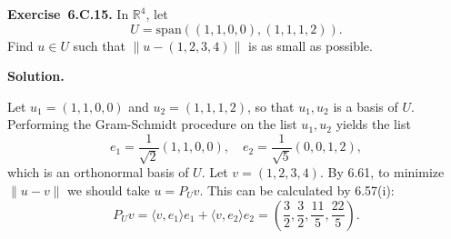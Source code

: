 \documentclass[11pt]{article}
\newcommand{\ProblemAnnounce}{\noindent}
\newcommand{\SolutionAnnounce}{\noindent\textbf{Solution.}\par\medskip}
\newcommand{\Exercise}[1]{\textbf{Exercise~#1.}\;}
\newcommand{\R}{\mathbb{R}}
\newcommand{\<}{\langle}
\renewcommand{\>}{\rangle}
\begin{document}
\begin{problemBox}
\ProblemAnnounce
\Exercise{6.C.15}
In $\R^4$, let
\[U = \text{span}((1, 1, 0, 0), (1, 1, 1, 2)).\]
Find $u \in U$ such that $\|u - (1, 2, 3, 4)\|$ is as small as possible.
\end{problemBox}

\begin{solutionBox}
\SolutionAnnounce
\doublespacing

Let $u_1 = (1, 1, 0, 0)$ and $u_2 = (1, 1, 1, 2)$, so that $u_1, u_2$ is a basis of $U$. Performing
the Gram-Schmidt procedure on the list $u_1, u_2$ yields the list
\[e_1 = \frac{1}{\sqrt{2}}(1, 1, 0, 0),\quad e_2 = \frac{1}{\sqrt{5}}(0, 0, 1, 2),\]
which is an orthonormal basis of $U$. Let $v = (1, 2, 3, 4)$. By 6.61, to minimize $\|u - v\|$
we should take $u = P_U v$. This can be calculated by 6.57(i):
\[P_U v = \<v, e_1\>e_1 + \<v, e_2\>e_2 = \left(\frac{3}{2}, \frac{3}{2}, \frac{11}{5}, \frac{22}{5}\right).\]
\end{solutionBox}
\end{document}
